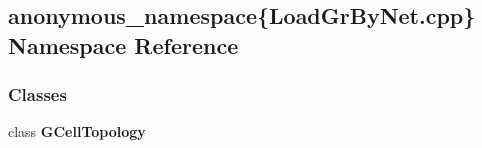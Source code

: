 \hypertarget{namespaceanonymous__namespace_02LoadGrByNet_8cpp_03}{\subsection{anonymous\-\_\-namespace\{Load\-Gr\-By\-Net.\-cpp\} Namespace Reference}
\label{namespaceanonymous__namespace_02LoadGrByNet_8cpp_03}
}
\subsubsection*{Classes}
\begin{DoxyCompactItemize}
\item 
class {\bf G\-Cell\-Topology}
\end{DoxyCompactItemize}
